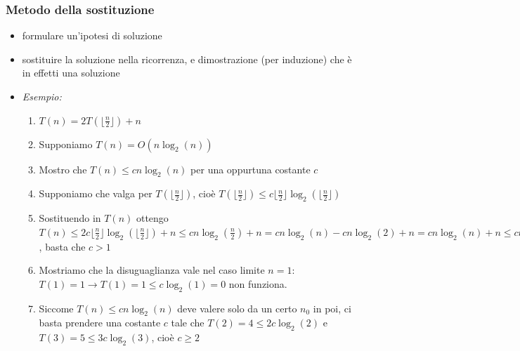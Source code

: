 \documentclass[10pt,a4paper]{article}
\begin{document}
\subsubsection*{Metodo della sostituzione}
\begin{itemize}
    \item formulare un'ipotesi di soluzione
    \item sostituire la soluzione nella ricorrenza, e dimostrazione (per induzione) che \`e in effetti una soluzione
    \item \emph{Esempio:}
    \begin{enumerate}
        \item $T(n) = 2T\left(\lfloor\frac{n}{2}\rfloor\right) + n$
        \item Supponiamo $T(n) = O(n\log_2(n))$
        \item Mostro che $T(n) \le cn\log_2(n)$ per una oppurtuna costante $c$
        \item Supponiamo che valga per $T\left(\lfloor\frac{n}{2}\rfloor\right)$, cio\`e $T\left(\lfloor\frac{n}{2}\rfloor\right) \le c\lfloor\frac{n}{2}\rfloor\log_2(\lfloor\frac{n}{2}\rfloor)$
        \item Sostituendo in $T(n)$ ottengo $T(n) \le 2c\lfloor\frac{n}{2}\rfloor\log_2(\lfloor\frac{n}{2}\rfloor) + n \le cn\log_2(\frac{n}{2}) + n = cn\log_2(n)-cn\log_2(2) + n = cn\log_2(n)+n \le cn\log_2(n)$, basta che $c > 1$
        \item Mostriamo che la disuguaglianza vale nel caso limite $n=1$: $T(1) = 1 \rightarrow T(1)=1\le c\log_2(1) = 0$ non funziona.
        \item Siccome $T(n) \le cn\log_2(n)$ deve valere solo da un certo $n_0$ in poi, ci basta prendere una costante $c$ tale che $T(2) = 4 \le 2c \log_2(2)$ e $T(3) = 5 \le 3c\log_2(3)$, cio\`e $c \ge 2$
    \end{enumerate}
\end{itemize}
\end{document}
